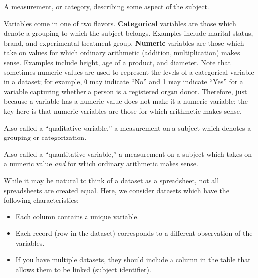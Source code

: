 \documentclass[]{book}
\providecommand{\tightlist}{%
  \setlength{\itemsep}{0pt}\setlength{\parskip}{0pt}}
\theoremstyle{definition}
\theoremstyle{definition}
\theoremstyle{remark}
\let\BeginKnitrBlock\begin \let\EndKnitrBlock\end
\begin{document}
\BeginKnitrBlock{definition}[Variable]
\protect\hypertarget{def:defn-variable}{}{\label{def:defn-variable}
{} }A measurement, or category, describing some
aspect of the subject.
\EndKnitrBlock{definition}

Variables come in one of two flavors. \textbf{Categorical} variables are
those which denote a grouping to which the subject belongs. Examples
include marital status, brand, and experimental treatment group.
\textbf{Numeric} variables are those which take on values for which
ordinary arithmetic (addition, multiplication) makes sense. Examples
include height, age of a product, and diameter. Note that sometimes
numeric values are used to represent the levels of a categorical
variable in a dataset; for example, 0 may indicate ``No'' and 1 may
indicate ``Yes'' for a variable capturing whether a person is a
registered organ donor. Therefore, just because a variable has a numeric
value does not make it a numeric variable; the key here is that numeric
variables are those for which arithmetic makes sense.

\BeginKnitrBlock{definition}[Categorical Variable]
\protect\hypertarget{def:defn-categorical}{}{\label{def:defn-categorical}
{} }Also called a ``qualitative
variable,'' a measurement on a subject which denotes a grouping or
categorization.
\EndKnitrBlock{definition}

\BeginKnitrBlock{definition}[Numeric Variable]
\protect\hypertarget{def:defn-numeric}{}{\label{def:defn-numeric}
{} }Also called a ``quantitative
variable,'' a measurement on a subject which takes on a numeric value
\emph{and} for which ordinary arithmetic makes sense.
\EndKnitrBlock{definition}

While it may be natural to think of a dataset as a spreadsheet, not all
spreadsheets are created equal. Here, we consider datasets which have
the following characteristics:

\begin{itemize}
\tightlist
\item
  Each column contains a unique variable.
\item
  Each record (row in the dataset) corresponds to a different
  observation of the variables.
\item
  If you have multiple datasets, they should include a column in the
  table that allows them to be linked (subject identifier).
\end{itemize}
\end{document}
